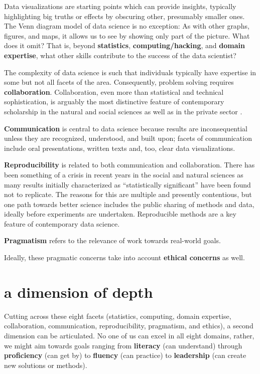 \documentclass[openany]{book}
\begin{document}
Data visualizations are starting points which can provide insights, typically highlighting big truths or effects by obscuring other, presumably smaller ones. The Venn diagram model of data science is no exception: As with other graphs, figures, and maps, it allows us to see by showing only part of the picture. What does it omit? That is, beyond \textbf{statistics}, \textbf{computing/hacking}, and \textbf{domain expertise}, what other skills contribute to the success of the data scientist?

The complexity of data science is such that individuals typically have expertise in some but not all facets of the area. Consequently, problem solving requires \textbf{collaboration}. Collaboration, even more than statistical and technical sophistication, is arguably the most distinctive feature of contemporary scholarship in the natural and social sciences as well as in the private sector \citep{isaacson2014innovators}.

\textbf{Communication} is central to data science because results are inconsequential unless they are recognized, understood, and built upon; facets of communication include oral presentations, written texts and, too, clear data visualizations.

\textbf{Reproducibility} is related to both communication and collaboration. There has been something of a crisis in recent years in the social and natural sciences as many results initially characterized as ``statistically significant'' have been found not to replicate. The reasons for this are multiple and presently contentious, but one path towards better science includes the public sharing of methods and data, ideally before experiments are undertaken. Reproducible methods are a key feature of contemporary data science.

\textbf{Pragmatism} refers to the relevance of work towards real-world goals.

Ideally, these pragmatic concerns take into account \textbf{ethical concerns} as well.

\hypertarget{a-dimension-of-depth}{%
\section{a dimension of depth}\label{a-dimension-of-depth}}

Cutting across these eight facets (statistics, computing, domain expertise, collaboration, communication, reproducibility, pragmatism, and ethics), a second dimension can be articulated. No one of us can excel in all eight domains, rather, we might aim towards goals ranging from \textbf{literacy} (can understand) through \textbf{proficiency} (can get by) to \textbf{fluency} (can practice) to \textbf{leadership} (can create new solutions or methods).
\end{document}
